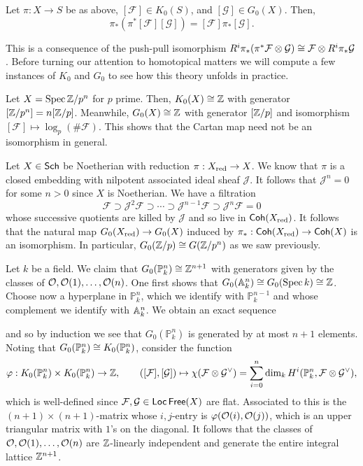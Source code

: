 \documentclass[11pt]{article}
\newcommand{\FF}{\mathcal{F}}
\newcommand{\GG}{\mathcal{G}}
\newcommand{\J}{\mathcal{J}}
\renewcommand{\P}{\mathbb{P}}
\renewcommand{\phi}{\varphi}
\begin{document}
\begin{proposition}
Let $\pi: X\to S$ be as above, $[\FF]\in K_0(S)$, and $[\GG]\in G_0(X)$. Then,
$$\pi_*(\pi^*[\FF][\GG])=[\FF]\pi_*[\GG].$$
\end{proposition}

This is a consequence of the push-pull isomorphism $R^i\pi_*(\pi^*\FF\tensor\GG)\iso\FF\tensor R^i\pi_*\GG$. Before turning our attention to homotopical matters we will compute a few instances of $K_0$ and $G_0$ to see how this theory unfolds in practice.

\begin{example}
\begin{enum}{\arabic}
\item Let $X=\operatorname{Spec}\mathbb{Z}/p^n$ for $p$ prime. Then, $K_0(X)\cong\mathbb{Z}$ with generator $[\mathbb{Z}/p^n]=n[\mathbb{Z}/p]$. Meanwhile, $G_0(X)\cong\mathbb{Z}$ with generator $[\mathbb{Z}/p]$ and isomorphism $[\FF]\mapsto\log_p(\#\FF)$. This shows that the Cartan map need not be an isomorphism in general.

\item Let $X\in\operatorname{\mathsf{Sch}}$ be Noetherian with reduction $\pi: X_{\operatorname{red}}\to X$. We know that $\pi$ is a closed embedding with nilpotent associated ideal sheaf $\J$. It follows that $\J^n=0$ for some $n>0$ since $X$ is Noetherian. We have a filtration
$$\FF\supset\J^2\FF\supset\cdots\supset\J^{n-1}\FF\supset\J^n\FF=0$$
whose successive quotients are killed by $\J$ and so live in $\operatorname{\mathsf{Coh}}(X_{\operatorname{red}})$. It follows that the natural map $G_0(X_{\operatorname{red}})\to G_0(X)$ induced by $\pi_*: \operatorname{\mathsf{Coh}}(X_{\operatorname{red}})\to\operatorname{\mathsf{Coh}}(X)$ is an isomorphism. In particular, $G_0(\mathbb{Z}/p)\cong G(\mathbb{Z}/p^n)$ as we saw previously.

\item Let $k$ be a field. We claim that $G_0(\P_k^n)\iso\Z^{n+1}$ with generators given by the classes of $\mathcal{O},\mathcal{O}(1),\ldots,\mathcal{O}(n)$. One first shows that $G_0(\mathbb{A}_k^n)\cong G_0(\operatorname{Spec} k)\cong\mathbb{Z}$. Choose now a hyperplane in $\P_k^n$, which we identify with $\P_k^{n-1}$ and whose complement we identify with $\mathbb{A}_k^n$. We obtain an exact sequence 
\begin{center}
\end{center}
and so by induction we see that $G_0(\P_k^n)$ is generated by at most $n+1$ elements. Noting that $G_0(\P_k^n)\iso K_0(\P_k^n)$, consider the function 
$$\phi: K_0(\P_k^n)\times K_0(\P_k^n)\to\Z,\qquad ([\FF],[\GG])\mapsto\chi(\FF\tensor\GG^{\vee})=\sum_{i=0}^n\dim_kH^i(\P_k^n,\FF\tensor\GG^{\vee}),$$
which is well-defined since $\FF,\GG\in\Loc\Free(X)$ are flat. Associated to this is the $(n+1)\times(n+1)$-matrix whose $i,j$-entry is $\phi(\O(i),\O(j))$, which is an upper triangular matrix with $1$'s on the diagonal. It follows that the classes of $\mathcal{O},\mathcal{O}(1),\ldots,\mathcal{O}(n)$ are $\mathbb{Z}$-linearly independent and generate the entire integral lattice $\mathbb{Z}^{n+1}$.
\end{enum}
\end{example}
\end{document}
